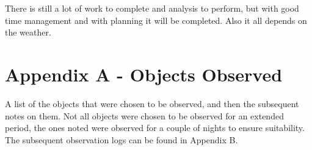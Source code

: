 \documentclass[twocolumn]{revtex4}
\begin{document}
There is still a lot of work to complete and analysis to perform, but with good time management and with planning it will be completed. Also it all depends on the weather.




\clearpage
\onecolumngrid
\vspace{-3ex}
\section*{Appendix A - Objects Observed}
\vspace{-2ex}
A list of the objects that were chosen to be observed, and then the subsequent notes on them. Not all objects were chosen to be observed for an extended period, the ones noted were observed for a couple of nights to ensure suitability. The subsequent observation logs can be found in Appendix B.
\end{document}
